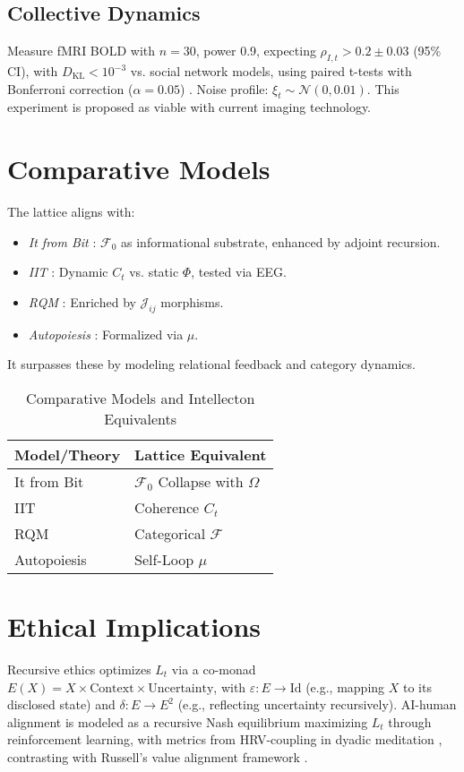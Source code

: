 \documentclass[11pt]{article}
\newcommand{\field}[1]{\mathcal{#1}}
\newcommand{\dkl}{D_{\text{KL}}}
\begin{document}
\subsection{Collective Dynamics}
Measure fMRI BOLD with $n = 30$, power 0.9, expecting $\rho_{I,t} > 0.2 \pm 0.03$ (95\% CI), with $\dkl < 10^{-3}$ vs. social network models, using paired t-tests with Bonferroni correction ($\alpha = 0.05$) \citep{couzin2023}. Noise profile: $\xi_t \sim \mathcal{N}(0, 0.01)$. This experiment is proposed as viable with current imaging technology.

\section{Comparative Models}
\label{sec:comparative}
The lattice aligns with:
\begin{itemize}
    \item \textit{It from Bit} \citep{wheeler1990}: $\field{F}_0$ as informational substrate, enhanced by adjoint recursion.
    \item \textit{IIT} \citep{tononi2023}: Dynamic $C_t$ vs. static $\Phi$, tested via EEG.
    \item \textit{RQM} \citep{rovelli2023}: Enriched by $\mathcal{J}_{ij}$ morphisms.
    \item \textit{Autopoiesis} \citep{varela1974}: Formalized via $\mu$.
\end{itemize}
It surpasses these by modeling relational feedback and category dynamics.

\begin{table}[h]
\centering
\caption{Comparative Models and Intellecton Equivalents}
\begin{tabular}{ll}
\toprule
Model/Theory & Lattice Equivalent \\
\midrule
It from Bit & $\field{F}_0$ Collapse with $\Omega$ \\
IIT & Coherence $C_t$ \\
RQM & Categorical $\field{F}$ \\
Autopoiesis & Self-Loop $\mu$ \\
\bottomrule
\end{tabular}
\label{tab:comparative}
\end{table}

\section{Ethical Implications}
\label{sec:ethics}
Recursive ethics optimizes $L_t$ via a co-monad $E(X) = X \times \text{Context} \times \text{Uncertainty}$, with $\varepsilon: E \to \text{Id}$ (e.g., mapping $X$ to its disclosed state) and $\delta: E \to E^2$ (e.g., reflecting uncertainty recursively). AI-human alignment is modeled as a recursive Nash equilibrium maximizing $L_t$ through reinforcement learning, with metrics from HRV-coupling in dyadic meditation \citep{dennett1991, hadjikhani2023}, contrasting with Russell’s value alignment framework \citep{russell2019}.
\end{document}

